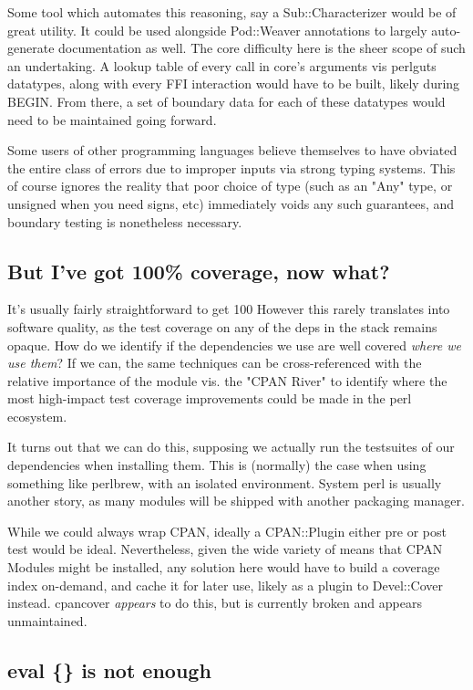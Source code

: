 \documentclass{article}
\begin{document}
Some tool which automates this reasoning, say a Sub::Characterizer would be of great utility. It could be used alongside Pod::Weaver annotations to largely auto-generate documentation as well.
The core difficulty here is the sheer scope of such an undertaking.  A lookup table of every call in core's arguments vis perlguts datatypes, along with every FFI interaction would have to be built, likely during BEGIN.
From there, a set of boundary data for each of these datatypes would need to be maintained going forward.

Some users of other programming languages believe themselves to have obviated the entire class of errors due to improper inputs via strong typing systems.
This of course ignores the reality that poor choice of type (such as an "Any" type, or unsigned when you need signs, etc) immediately voids any such guarantees, and boundary testing is nonetheless necessary.

\subsection{But I've got 100\% coverage, now what?}

It's usually fairly straightforward to get 100%
However this rarely translates into software quality, as the test coverage on any of the deps in the stack remains opaque.
How do we identify if the dependencies we use are well covered \textit{where we use them}?
If we can, the same techniques can be cross-referenced with the relative importance of the module vis. the "CPAN River" to identify where the most high-impact test coverage improvements could be made in the perl ecosystem.

It turns out that we can do this, supposing we actually run the testsuites of our dependencies when installing them.
This is (normally) the case when using something like perlbrew, with an isolated environment.
System perl is usually another story, as many modules will be shipped with another packaging manager.

While we could always wrap CPAN, ideally a CPAN::Plugin either pre or post test would be ideal.
Nevertheless, given the wide variety of means that CPAN Modules might be installed, any solution here would have to build a coverage index on-demand, and cache it for later use, likely as a plugin to Devel::Cover instead.
cpancover \textit{appears} to do this, but is currently broken and appears unmaintained.

\subsection{eval \{\} is not enough}
\end{document}
